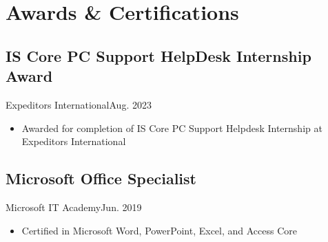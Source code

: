 \section{Awards \& Certifications}
\subsection{IS Core PC Support HelpDesk Internship Award}{Expeditors International}{Aug. 2023} 
\begin{itemize}
    \item Awarded for completion of IS Core PC Support Helpdesk Internship at Expeditors International  
\end{itemize} 
\subsection{Microsoft Office Specialist}{Microsoft IT Academy}{Jun. 2019}
\begin{itemize}
    \item Certified in Microsoft Word, PowerPoint, Excel, and Access Core
\end{itemize}